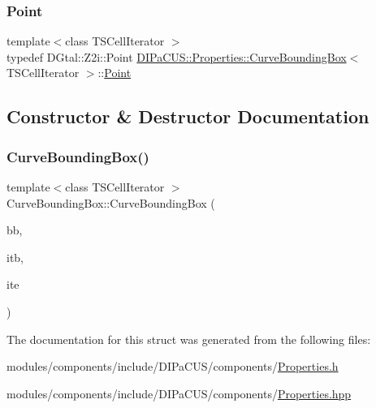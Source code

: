 \subsubsection{\texorpdfstring{Point}{Point}}
{\footnotesize\ttfamily template$<$class T\+S\+Cell\+Iterator $>$ \\
typedef D\+Gtal\+::\+Z2i\+::\+Point \mbox{\hyperlink{structDIPaCUS_1_1Properties_1_1CurveBoundingBox}{D\+I\+Pa\+C\+U\+S\+::\+Properties\+::\+Curve\+Bounding\+Box}}$<$ T\+S\+Cell\+Iterator $>$\+::\mbox{\hyperlink{structDIPaCUS_1_1Properties_1_1CurveBoundingBox_ad97cc519eea736f20195540853c23616}{Point}}}



\subsection{Constructor \& Destructor Documentation}
\mbox{\label{structDIPaCUS_1_1Properties_1_1CurveBoundingBox_ae2f636bbbe52447ad70d8195737e5597}} 
\subsubsection{\texorpdfstring{Curve\+Bounding\+Box()}{CurveBoundingBox()}}
{\footnotesize\ttfamily template$<$class T\+S\+Cell\+Iterator $>$ \\
Curve\+Bounding\+Box\+::\+Curve\+Bounding\+Box (\begin{DoxyParamCaption}\item[{\mbox{\hyperlink{structDIPaCUS_1_1Properties_1_1CurveBoundingBox_1_1BoundingBox}{Bounding\+Box}} \&}]{bb,  }\item[{T\+S\+Cell\+Iterator}]{itb,  }\item[{T\+S\+Cell\+Iterator}]{ite }\end{DoxyParamCaption})}



The documentation for this struct was generated from the following files\+:\begin{DoxyCompactItemize}
\item 
modules/components/include/\+D\+I\+Pa\+C\+U\+S/components/\mbox{\hyperlink{Properties_8h}{Properties.\+h}}\item 
modules/components/include/\+D\+I\+Pa\+C\+U\+S/components/\mbox{\hyperlink{Properties_8hpp}{Properties.\+hpp}}\end{DoxyCompactItemize}
